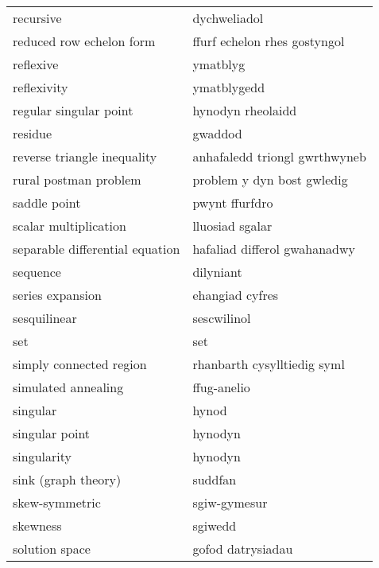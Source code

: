 \begin{supertabular}{p{0.22\textwidth}p{0.22\textwidth}}
                        recursive &                     dychweliadol \\
         reduced row echelon form &     ffurf echelon rhes gostyngol \\
                        reflexive &                         ymatblyg \\
                      reflexivity &                      ymatblygedd \\
           regular singular point &                hynodyn rheolaidd \\
                          residue &                          gwaddod \\
      reverse triangle inequality &    anhafaledd triongl gwrthwyneb \\
            rural postman problem &       problem y dyn bost gwledig \\
                     saddle point &                   pwynt ffurfdro \\
            scalar multiplication &                  lluosiad sgalar \\
  separable differential equation &     hafaliad differol gwahanadwy \\
                         sequence &                        dilyniant \\
                 series expansion &                  ehangiad cyfres \\
                     sesquilinear &                      sescwilinol \\
                              set &                              set \\
          simply connected region &      rhanbarth cysylltiedig syml \\
              simulated annealing &                      ffug-anelio \\
                         singular &                            hynod \\
                   singular point &                          hynodyn \\
                      singularity &                          hynodyn \\
              sink (graph theory) &                          suddfan \\
                   skew-symmetric &                     sgiw-gymesur \\
                         skewness &                          sgiwedd \\
                   solution space &                gofod datrysiadau \\

\end{supertabular}
